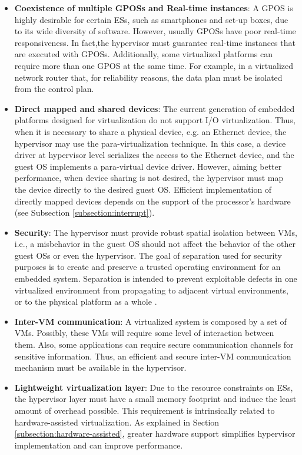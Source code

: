 \begin{itemize}
\item \textbf{Coexistence of multiple GPOSs and Real-time instances}: A GPOS is highly desirable for certain ESs, such as smartphones and set-up boxes, due to its wide diversity of software. However, usually GPOSs have poor real-time responsiveness. In fact,the hypervisor must guarantee real-time instances that are executed with GPOSs. Additionally,  some virtualized platforms can require more than one GPOS at the same time. For example, in a virtualized network router that, for reliability reasons, the data plan must be isolated from the control plan. 

\item \textbf{Direct mapped and shared devices}: The current generation of embedded platforms designed for virtualization do not support I/O virtualization. Thus, when it is necessary to share a physical device, e.g. an Ethernet device, the hypervisor may use the para-virtualization technique. In this case, a device driver at hypervisor level serializes the access to the Ethernet device, and the guest OS implements a para-virtual device driver. However, aiming better performance, when device sharing is not desired, the hypervisor must map the device directly to the desired guest OS. Efficient implementation of directly mapped devices depends on the support of the processor's hardware (see Subsection \ref{subsection:interrupt}).

\item \textbf{Security}: The hypervisor must provide robust spatial isolation between VMs, i.e., a misbehavior in the guest OS should not affect the behavior of the other guest OSs or even the hypervisor. The goal of separation used for security purposes is to create and preserve a trusted operating environment for an embedded system. Separation is intended to prevent exploitable defects in one virtualized environment from propagating to adjacent virtual environments, or to the physical platform as a whole \cite{security-prpl}.

\item \textbf{Inter-VM communication}: A virtualized system is composed by a set of VMs. Possibly, these VMs will require some level of interaction between them. Also, some applications can require secure communication channels for sensitive information. Thus, an efficient and secure inter-VM communication mechanism must be available in the hypervisor.

\item \textbf{Lightweight virtualization layer}: Due to the resource constraints on ESs, the hypervisor layer must have a small memory footprint and induce the least amount of overhead possible. This requirement is intrinsically related to hardware-assisted virtualization. As explained in Section \ref{subsection:hardware-assisted}, greater hardware support simplifies hypervisor implementation and can improve performance.   
\end{itemize}

